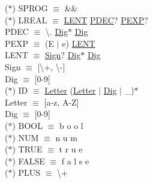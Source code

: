 \documentclass[\main/MemoriaPL.tex]{subfiles}
\begin{document}
    \vspace{2mm}
    \hspace{5mm}($\ast$) SPROG $\equiv$ \&\& \\
    \vspace{2mm}
    \hspace{5mm}($\ast$) LREAL $\equiv$ \underline{LENT} \underline{PDEC}? \underline{PEXP}? \\
      \hspace{10mm} PDEC $\equiv$ \textbackslash. \underline{Dig}$\ast$ \underline{Dig} \\
      \hspace{10mm} PEXP $\equiv$ (E $\mid$ e) \underline{LENT} \\
      \vspace{2mm}
      \hspace{10mm} LENT $\equiv$ \underline{Sign}? \underline{Dig}$\ast$ \underline{Dig} \\
      \hspace{10mm} Sign $\equiv$ [\textbackslash+, \textbackslash-] \\
      \hspace{10mm} Dig   $\equiv$ [0-9] \\
      \vspace{2mm}
    \hspace{5mm}($\ast$) ID $\equiv$ \underline{Letter} (\underline{Letter} $\mid$ \underline{Dig} $\mid$ \_)$\ast$ \\
      \hspace{10mm} Letter $\equiv$ [a-z, A-Z] \\
      \hspace{10mm} Dig $\equiv$ [0-9] \\
    \vspace{2mm}
      \hspace{5mm}($\ast$) BOOL $\equiv$ b o o l \\
    \vspace{2mm}
    \hspace{5mm}($\ast$) NUM $\equiv$ n u m \\
    \vspace{2mm}
    \hspace{5mm}($\ast$) TRUE $\equiv$ t r u e \\
    \vspace{2mm}
    \hspace{5mm}($\ast$) FALSE $\equiv$ f a l s e \\
    \vspace{2mm}
    \hspace{5mm}($\ast$) PLUS $\equiv$ \textbackslash + \\
\end{document}
